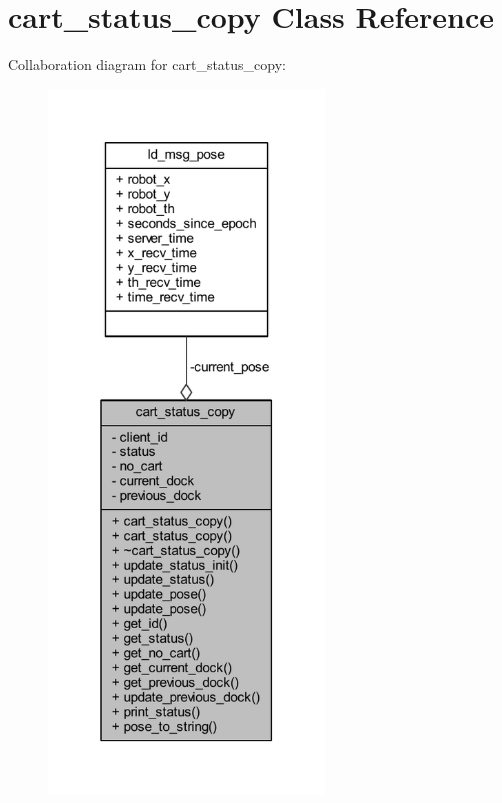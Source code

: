 \hypertarget{classcart__status__copy}{}\section{cart\+\_\+status\+\_\+copy Class Reference}
\label{classcart__status__copy}


Collaboration diagram for cart\+\_\+status\+\_\+copy\+:\nopagebreak
\begin{figure}[H]
\begin{center}
\leavevmode
\includegraphics[width=208pt]{classcart__status__copy__coll__graph}
\end{center}
\end{figure}
